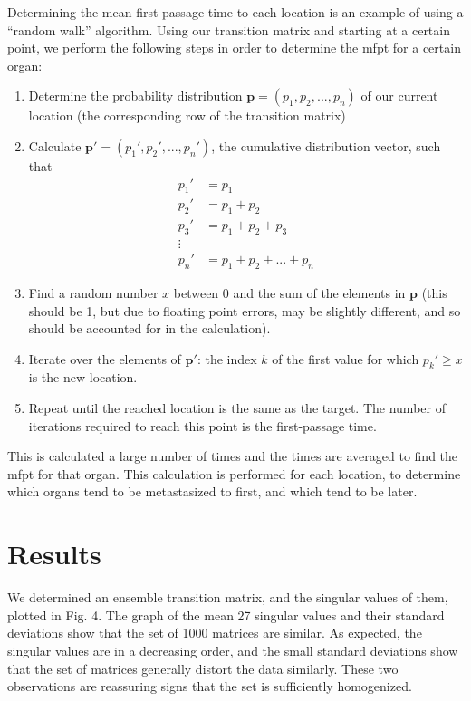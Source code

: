 \documentclass[letterpaper,12pt]{article}
\newcommand{\vect}[1]{\boldsymbol{#1}}
\begin{document}
Determining the mean first-passage time to each location is an example of using a ``random walk'' algorithm. Using our transition matrix and starting at a certain point, we perform the following steps in order to determine the mfpt for a certain organ:

\begin{enumerate}
\item Determine the probability distribution $\vect{p} = (p_1, p_2, ..., p_n)$ of our current location (the corresponding row of the transition matrix)

\item Calculate $\vect{p}' = (p_1', p_2', ..., p_n')$, the cumulative distribution vector, such that
\begin{align*}
p_1' &= p_1 \\
p_2' &= p_1 + p_2 \\
p_3' &= p_1 + p_2 + p_3 \\
\vdots \\
p_n' &= p_1 + p_2 + ... + p_n
\end{align*}

\item Find a random number $x$ between 0 and the sum of the elements in $\vect{p}$ (this should be 1, but due to floating point errors, may be slightly different, and so should be accounted for in the calculation).

\item Iterate over the elements of $\vect{p}'$: the index $k$ of the first value for which $p_k' \geq x$ is the new location.

\item Repeat until the reached location is the same as the target. The number of iterations required to reach this point is the first-passage time.

\end{enumerate}

This is calculated a large number of times and the times are averaged to find the mfpt for that organ. This calculation is performed for each location, to determine which organs tend to be metastasized to first, and which tend to be later.

\section{Results}

We determined an ensemble transition matrix, and the singular values of them, plotted in Fig. 4. The graph of the mean 27 singular values and their standard deviations show that the set of 1000 matrices are similar. As expected, the singular values are in a decreasing order, and the small standard deviations show that the set of matrices generally distort the data similarly. These two observations are reassuring signs that the set is sufficiently homogenized.
\end{document}
